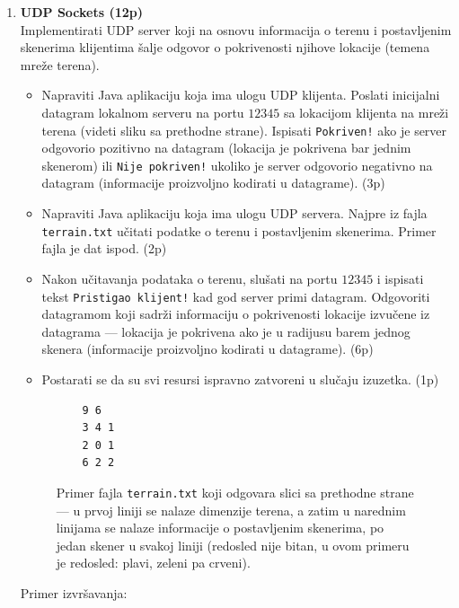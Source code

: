 \documentclass[]{article}
\begin{document}
\begin{enumerate}
\item \textbf{UDP Sockets (12p)}
\\Implementirati UDP server koji na osnovu informacija o terenu i postavljenim skenerima klijentima \v{s}alje odgovor o pokrivenosti njihove lokacije (temena mre\v{z}e terena). 
\begin{itemize}
  \item Napraviti Java aplikaciju koja ima ulogu UDP klijenta. Poslati inicijalni datagram lokalnom serveru na portu $12345$ sa lokacijom klijenta na mre\v{z}i terena (videti sliku sa prethodne strane). Ispisati \texttt{Pokriven!} ako je server odgovorio pozitivno na datagram (lokacija je pokrivena bar jednim skenerom) ili \texttt{Nije pokriven!} ukoliko je server odgovorio negativno na datagram (informacije proizvoljno kodirati u datagrame). \hfill (3p)
  \item Napraviti Java aplikaciju koja ima ulogu UDP servera. Najpre iz fajla \texttt{terrain.txt} u\v{c}itati podatke o terenu i postavljenim skenerima. Primer fajla je dat ispod. \hfill (2p)
  \item Nakon u\v{c}itavanja podataka o terenu, slu\v{s}ati na portu $12345$ i ispisati tekst \texttt{Pristigao klijent!} kad god server primi datagram. Odgovoriti datagramom koji sadr\v{z}i informaciju o pokrivenosti lokacije izvu\v{c}ene iz datagrama --- lokacija je pokrivena ako je u radijusu barem jednog skenera (informacije proizvoljno kodirati u datagrame). \hfill (6p)
  \item Postarati se da su svi resursi ispravno zatvoreni u slu\v{c}aju izuzetka. \hfill (1p)
\end{itemize}

\vspace{10pt}

\begin{figure}[h!]
  \noindent
  \begin{lstlisting}
    9 6
    3 4 1
    2 0 1
    6 2 2
  \end{lstlisting}
  \caption{Primer fajla \texttt{terrain.txt} koji odgovara slici sa prethodne strane --- u prvoj liniji se nalaze dimenzije terena, a zatim u narednim linijama se nalaze informacije o postavljenim skenerima, po jedan skener u svakoj liniji (redosled nije bitan, u ovom primeru je redosled: plavi, zeleni pa crveni).}
\end{figure}

\vspace{15pt}
Primer izvr\v{s}avanja:


\end{enumerate}
\end{document}

